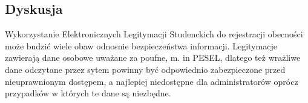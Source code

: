 \subsection{Dyskusja} 
Wykorzystanie Elektronicznych Legitymacji Studenckich do rejestracji obecności może budzić wiele obaw odnosnie bezpieczeństwa informacji. Legitymacje zawierają dane osobowe uważane za poufne, m. in PESEL, dlatego też wrażliwe dane odczytane przez sytem powinny być odpowiednio zabezpieczone przed nieuprawnionym dostępem, a najlepiej niedostępne dla administratorów oprócz przypadków w których te dane są niezbędne.